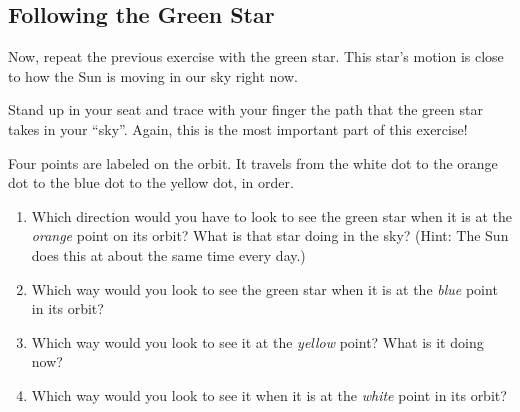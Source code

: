 \documentclass[12pt]{article}
\newcommand{\BS}{\bigskip}
\begin{document}
\subsection{Following the Green Star}

Now, repeat the previous exercise with the green star. This star's motion is close to how the Sun is moving in our sky right now. 

Stand up in your seat and trace with your finger the path that the green star takes in your ``sky''. Again, this is the most important part of this exercise!

Four points are labeled on the orbit. It travels from the white dot to the orange dot to the blue dot to the yellow dot, in order.

\begin{enumerate}
	\item Which direction would you have to look to see the green star when it is at the {\it orange} point on its orbit? What is that star doing in the sky? (Hint: The Sun does this at about the same time every day.)
	
	\BS\BS\BS
	
	\item Which way would you look to see the green star when it is at the {\it blue} point in its orbit?
	\BS\BS\BS	
	\item Which way would you look to see it at the {\it yellow} point? What is it doing now?
	\BS\BS\BS
	\item Which way would you look to see it when it is at the {\it white} point in its orbit?
	\BS\BS\BS
\end{enumerate}

\newpage
\end{document}
